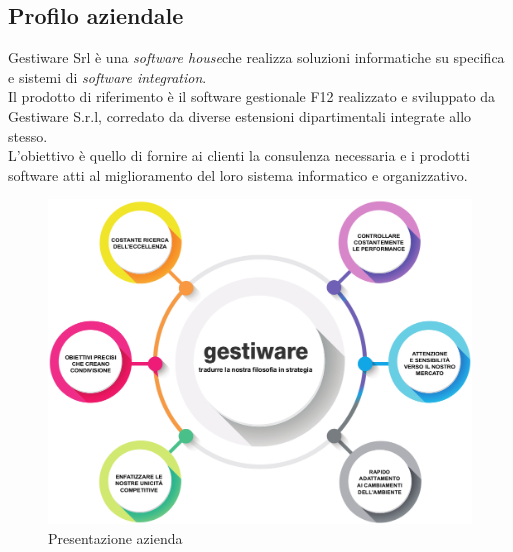 \subsection{Profilo aziendale}
    Gestiware Srl è una \emph{\textit{software house}}\glsfirstoccur che realizza soluzioni informatiche su specifica e sistemi di \emph{\textit{software integration}}\glsfirstoccur.
    \\
    Il prodotto di riferimento è il software gestionale F12 realizzato e sviluppato da Gestiware S.r.l, corredato da diverse estensioni dipartimentali integrate allo stesso.
    \\
    L'obiettivo è quello di fornire ai clienti la consulenza necessaria e i prodotti software atti al miglioramento del loro sistema informatico e organizzativo.
    \begin{figure}[!h] 
        \centering 
        \includegraphics[width=1\columnwidth]{immagini/505-TEST4.jpg}
        \caption{Presentazione azienda}
    \end{figure}
    \newpage
